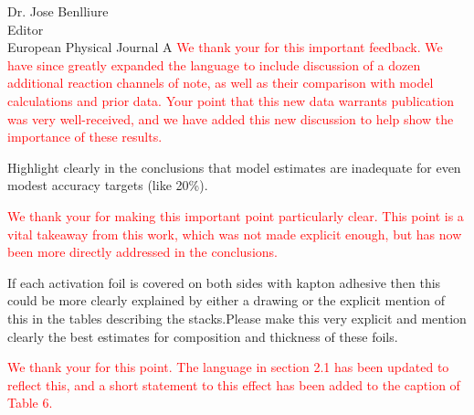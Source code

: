 \documentclass{letter} %
\newcommand{\colornote}[1]{\textcolor{red}{#1}}
\begin{document}
\begin{letter}{Dr. Jose Benlliure \\
Editor \\
European Physical Journal A}
\colornote{We thank your for this important feedback. We have since greatly expanded the language to include discussion of a dozen additional reaction channels of note, as well as their comparison with model calculations and prior data. Your point that this new data warrants publication was very well-received, and we have added this new discussion to help show the importance of these results.}


Highlight clearly in the conclusions that model estimates are inadequate for even modest accuracy targets (like 20\%).

\colornote{We thank your for making this important point particularly clear. This point is a vital takeaway from this work, which was not made explicit enough, but has now been more directly addressed in the conclusions.}

If each activation foil is covered on both sides with kapton adhesive then this could be more clearly explained by either a drawing or the explicit mention of this in the tables describing the stacks.Please make this very explicit and mention clearly the best estimates for composition and thickness of these foils.

\colornote{We thank your for this point.  The language in section 2.1 has been updated to reflect this, and a short statement to this effect has been added to the caption of Table 6.}

 

 

\end{letter}
 
\end{document}
